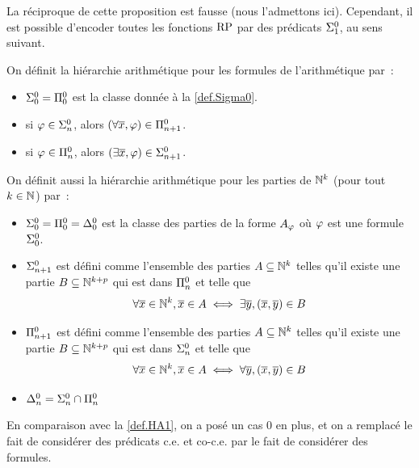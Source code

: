 La réciproque de cette proposition est fausse (nous l'admettons ici). Cependant,
il est possible d'encoder toutes les fonctions $\operatorname{RP}$ par des prédicats
$\Sigma^0_{1}$, au sens suivant.

\begin{definition}\label{def.HA2}
  On définit la hiérarchie arithmétique pour les formules de l'arithmétique
  par~:
  \begin{itemize}
  \item $\Sigma^0_{0} = \Pi^0_{0}$ est la classe donnée à
    la \cref{def.Sigma0}.
  \item si $\varphi \in \Sigma^0_{n}$, alors
    $(\forall \overline{x}, \varphi) \in \Pi^0_{n+1}$.
  \item si $\varphi \in \Pi^0_{n}$, alors
    $(\exists \overline{x}, \varphi) \in \Sigma^0_{n+1}$.
  \end{itemize}

  On définit aussi la hiérarchie arithmétique pour les parties de $\mathbb N^k$ (pour
  tout $k \in \mathbb N$) par~:
  \begin{itemize}
  \item $\Sigma^0_{0} = \Pi^0_{0} = \Delta^0_{0}$ est la classe des
    parties de la forme $A_{\varphi}$ où $\varphi$ est une formule
    $\Sigma^0_{0}$.
  \item $\Sigma^0_{n+1}$ est défini comme l'ensemble des parties
    $A \subseteq \mathbb N^{k}$ telles qu'il existe une partie
    $B \subseteq \mathbb N^{k+p}$ qui est dans $\Pi^0_{n}$ et telle que
    \[\forall \overline{x} \in \mathbb N^k, \overline{x} \in A \iff
    \exists \overline{y}, (\overline{x},\overline{y}) \in B\]
  \item $\Pi^0_{n+1}$ est défini comme l'ensemble des parties
    $A \subseteq \mathbb N^k$ telles qu'il existe une partie
    $B \subseteq \mathbb N^{k+p}$ qui est dans $\Sigma^0_{n}$ et telle que
    \[\forall \overline{x} \in \mathbb N^k, \overline{x} \in A \iff
    \forall \overline{y}, (\overline{x}, \overline{y}) \in B\]
  \item $\Delta^0_{n} = \Sigma^0_{n} \cap \Pi^0_{n}$
  \end{itemize}
\end{definition}

En comparaison avec la \cref{def.HA1}, on a posé un cas $0$ en plus, et on a
remplacé le fait de considérer des prédicats c.e. et co-c.e. par le fait de
considérer des formules.

